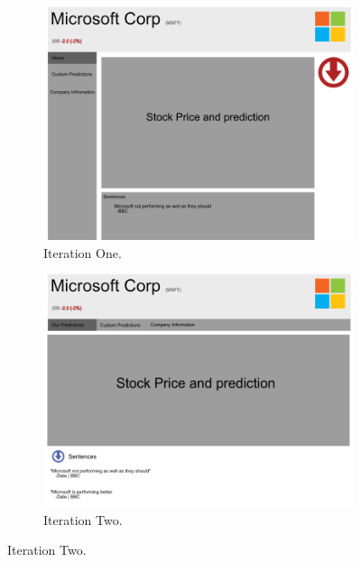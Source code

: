         \begin{figure}[!h]
            \begin{subfigure}[b]{0.3\textwidth}
                \includegraphics[width=\textwidth]{images/upload/Company-Wireframe1.png}
                \caption{Iteration One.}
                \label{fig:company_it1}
            \end{subfigure}
            \hfill
            \begin{subfigure}[b]{0.3\textwidth}
                \includegraphics[width=\textwidth]{images/upload/Company Wireframe 3.png}
                \caption{Iteration Two.}
                \label{fig:company_it2}
            \end{subfigure}

\end{figure}
